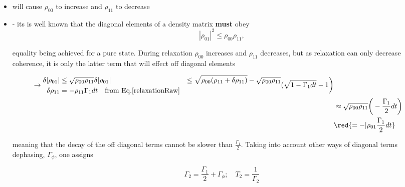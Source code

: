  \begin{itemize}
 \item \textbf{} will cause  $ \rho_{00} $ to increase
   and $ \rho_{11} $ to decrease
 \item  \textbf{}  -  its is  well  known that  the
   diagonal elements of a density matrix \textbf{must} obey
   \begin{equation}\label{pd1}
     |\rho_{01}|^2\le\rho_{00}\rho_{11},
   \end{equation}

   \noindent  equality  being  achieved   for  a  pure  state.   During
   relaxation $ \rho_{00} $ increases  and $ \rho_{11} $ decreases, but
   as relaxation  can only  decrease coherence, it  is only  the latter
   term that will effect off diagonal elements

   \begin{equation}\label{pd2}
     \begin{aligned} \rightarrow
       \begin{aligned}
         \delta|\rho_{01}| & \le\sqrt{\rho_{00}\rho_{11}}
         \delta|\rho_{01}| & \le \sqrt{\rho_{00}(\rho_{11}+\delta\rho_{11})} - \sqrt{\rho_{00}\rho_{11}}\\
         \delta\rho_{11}   &    =   -\rho_{11}\Gamma_1dt\quad\text{from
           Eq.\eqref{relaxationRaw}}
       \end{aligned}
       (\sqrt{1-\Gamma_1dt}-1\bigg) \\ & \approx
       \sqrt{\rho_{00}\rho_{11}} \bigg(-\frac{\Gamma_1}{2}dt  \bigg) \\
       & \red{ = -|\rho_{01}\frac{\Gamma_1}{2}dt}
     \end{aligned}
   \end{equation}

   \noindent meaning that the decay of the off diagonal terms cannot be
   slower than $  \frac{\Gamma_1}{2} $. Taking into  account other ways
   of diagonal terms dephasing, $ \Gamma_\phi $, one assigns

  \begin{equation}\label{pd3}
    \Gamma_2 = \frac{\Gamma_1}{2}+\Gamma_\phi;\quad T_2 = \frac{1}{\Gamma_2}
  \end{equation}
\end{itemize}

\begin{framed}\noindent
\end{framed}

